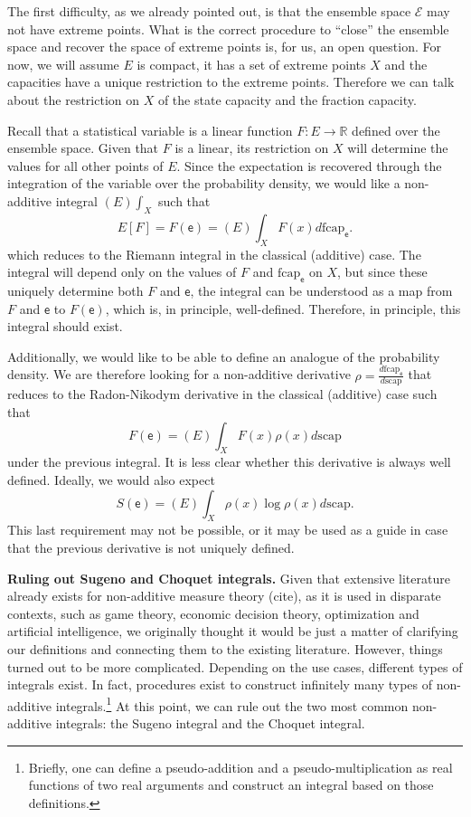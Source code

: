\documentclass[10pt,twocolumn, nofootinbib]{revtex4-2}
\newcommand\capacity{\mathrm{scap}}
\newcommand\frcap{\mathrm{fcap}}
\newcommand{\ens}[1][e] {\mathsf{#1}} %
\newcommand{\Ens}[1][E] {\mathcal{#1}} %
\begin{document}
The first difficulty, as we already pointed out, is that the ensemble space $\Ens$ may not have extreme points. What is the correct procedure to ``close'' the ensemble space and recover the space of extreme points is, for us, an open question. For now, we will assume $E$ is compact, it has a set of extreme points $X$ and the capacities have a unique restriction to the extreme points. Therefore we can talk about the restriction on $X$ of the state capacity and the fraction capacity.

Recall that a statistical variable is a linear function $F : E \to \mathbb{R}$ defined over the ensemble space. Given that $F$ is a linear, its restriction on $X$ will determine the values for all other points of $E$. Since the expectation is recovered through the integration of the variable over the probability density, we would like a non-additive integral $(E)\int_X$ such that
\begin{equation}
	E[F] = F(\ens) = (E)\int_X F(x) d\frcap_{\ens}.
\end{equation}
which reduces to the Riemann integral in the classical (additive) case. The integral will depend only on the values of $F$ and $\frcap_{\ens}$ on $X$, but since these uniquely determine both $F$ and $\ens$, the integral can be understood as a map from $F$ and $\ens$ to $F(\ens)$, which is, in principle, well-defined. Therefore, in principle, this integral should exist.

Additionally, we would like to be able to define an analogue of the probability density. We are therefore looking for a non-additive derivative $\rho = \frac{d \frcap_{\ens}}{d \capacity}$ that reduces to the Radon-Nikodym derivative in the classical (additive) case such that
\begin{equation}
	F(\ens) = (E)\int_X F(x) \rho(x) d\capacity
\end{equation}
under the previous integral. It is less clear whether this derivative is always well defined. Ideally, we would also expect
\begin{equation}
	S(\ens) = (E)\int_X \rho(x) \log \rho(x) d\capacity.
\end{equation}
This last requirement may not be possible, or it may be used as a guide in case that the previous derivative is not uniquely defined.

\textbf{Ruling out Sugeno and Choquet integrals.} Given that extensive literature already exists for non-additive measure theory (cite), as it is used in disparate contexts, such as game theory, economic decision theory, optimization and artificial intelligence, we originally thought it would be just a matter of clarifying our definitions and connecting them to the existing literature. However, things turned out to be more complicated. Depending on the use cases, different types of integrals exist. In fact, procedures exist\cite{nonadditive2014,pap2013} to construct infinitely many types of non-additive integrals.\footnote{Briefly, one can define a pseudo-addition and a pseudo-multiplication as real functions of two real arguments and construct an integral based on those definitions.} At this point, we can rule out the two most common non-additive integrals: the Sugeno integral and the Choquet integral.
\end{document}
